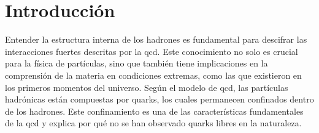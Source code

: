 \chapter*{Introducción}

\pagestyle{fancy}
\fancyhf{} %



Entender la estructura interna de los hadrones es fundamental para descifrar las interacciones fuertes descritas por la \gls{qcd}. Este conocimiento no solo es crucial para la física de partículas, sino que también tiene implicaciones en la comprensión de la materia en condiciones extremas, como las que existieron en los primeros momentos del universo. Según el modelo de \gls{qcd}, las partículas hadrónicas están compuestas por quarks, los cuales permanecen confinados dentro de los hadrones. Este confinamiento es una de las características fundamentales de la \gls{qcd} y explica por qué no se han observado quarks libres en la naturaleza.

\renewcommand{\figurename}{Fig.}


